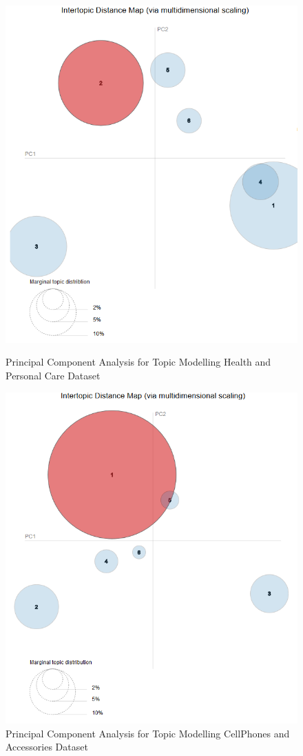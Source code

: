 \documentclass[10pt,conference]{IEEEtran}
\begin{document}
\begin{figure}[t]
  \includegraphics[width=\linewidth]{img/lda/2.PNG}
  \caption{Principal Component Analysis for Topic Modelling Health and Personal Care Dataset}
  \label{fig:2}
\endminipage\hfill
{}
  \includegraphics[width=\linewidth]{img/lda/3.PNG}
  \caption{Principal Component Analysis for Topic Modelling CellPhones and Accessories Dataset}
  \label{fig:3}
\endminipage
\end{figure}
\end{document}
